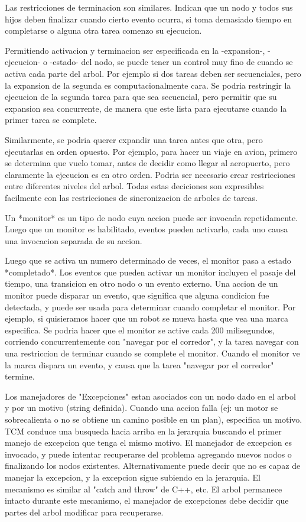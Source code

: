 Las restricciones de terminacion son similares. Indican que un nodo y todos sus hijos deben finalizar cuando cierto evento ocurra,
si toma demasiado tiempo en completarse o alguna otra tarea comenzo su ejecucion.

Permitiendo activacion y terminacion ser especificada en la -expansion-, -ejecucion- o -estado- del nodo, se puede tener un control
muy fino de cuando se activa cada parte del arbol.
Por ejemplo si dos tareas deben ser secuenciales, pero la expansion de la segunda es computacionalmente cara. Se podria
restringir la ejecucion de la segunda tarea para que sea secuencial, pero permitir que su expansion sea concurrente, de manera
que este lista para ejecutarse cuando la primer tarea se complete.

Similarmente, se podria querer expandir una tarea antes que otra, pero ejecutarlas en orden opuesto. Por ejemplo, para hacer un
viaje en avion, primero se determina que vuelo tomar, antes de decidir como llegar al aeropuerto, pero claramente la ejecucion
es en otro orden.
Podria ser necesario crear restricciones entre diferentes niveles del arbol.
Todas estas deciciones son expresibles facilmente con las restricciones de sincronizacion de arboles de tareas.


Un *monitor* es un tipo de nodo cuya accion puede ser invocada repetidamente. Luego que un monitor es habilitado, eventos
pueden activarlo, cada uno causa una invocacion separada de su accion.

Luego que se activa un numero determinado de veces, el monitor pasa a estado *completado*.
Los eventos que pueden activar un monitor incluyen el pasaje del tiempo, una transicion en otro nodo o un evento externo.
Una accion de un monitor puede disparar un evento, que significa que alguna condicion fue detectada, y puede ser usada para determinar
cuando completar el monitor.
Por ejemplo, si quisieramos hacer que un robot se mueva hasta que vea una marca especifica. Se podria hacer que el monitor se active cada 
200 milisegundos, corriendo concurrentemente con "navegar por el corredor", y la tarea navegar con una restriccion de terminar cuando
se complete el monitor.
Cuando el monitor ve la marca dispara un evento, y causa que la tarea "navegar por el corredor" termine.

Los manejadores de "Excepciones" estan asociados con un nodo dado en el arbol y por un motivo (string definida).
Cuando una accion falla (ej: un motor se sobrecalienta o no se obtiene un camino posible en un plan), especifica 
un motivo.
TCM conduce una busqueda hacia arriba en la jerarquia buscando el primer manejo de excepcion que tenga el mismo motivo.
El manejador de excepcion es invocado, y puede intentar recuperarse del problema agregando nuevos nodos o finalizando los nodos
existentes.
Alternativamente puede decir que no es capaz de manejar la excepcion, y la excepcion sigue subiendo en la jerarquia.
El mecanismo es similar al "catch and throw" de C++, etc.
El arbol permanece intacto durante este mecanismo, el manejador de excepciones debe decidir que partes del arbol modificar para recuperarse.


